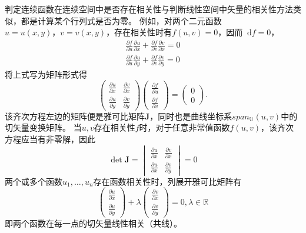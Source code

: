 \documentclass[UTF8]{ctexart}
\newcommand{\dif}{\mathop{}\!\mathrm{d}}
\begin{document}
判定连续函数在连续空间中是否存在相关性与判断线性空间中矢量的相关性方法类似，都是计算某个行列式是否为零。
例如，对两个二元函数$u=u(x,y)，v=v(x,y)$，存在相关性时有$f(u,v)=0$，因而$\dif f=0$，
\begin{eqnarray}
\frac{\partial f}{\partial u}\frac{\partial u}{\partial x}+\frac{\partial f}{\partial v}\frac{\partial v}{\partial x}=0\\
 \frac{\partial f}{\partial u}\frac{\partial u}{\partial y}+\frac{\partial f}{\partial v}\frac{\partial v}{\partial y}=0
\end{eqnarray}
将上式写为矩阵形式得
\begin{equation}
    \left(\begin{array}{cc}
        \frac{\partial u}{\partial x} & \frac{\partial v}{\partial x}\\
        \frac{\partial u}{\partial y} & \frac{\partial v}{\partial y}
    \end{array}\right)
    \left(\begin{array}{c}
        \frac{\partial f}{\partial u}\\
        \frac{\partial f}{\partial v}
    \end{array}\right)
    =
    \left(\begin{array}{c}
        0 \\ 0
    \end{array}\right).
\end{equation}
该齐次方程左边的矩阵便是雅可比矩阵\textbf{J}，同时也是曲线坐标系$span_{\mathbb{U}}(u,v)$中的切矢量变换矩阵。
当$u,v$存在相关性$f$时，对于任意非常值函数$f(u,v)$，该齐次方程应当有非零解，因此
\begin{equation}
    \det{\textbf{J}}=
    \begin{vmatrix}
        \frac{\partial u}{\partial x} & \frac{\partial v}{\partial x}\\
        \frac{\partial u}{\partial x} & \frac{\partial v}{\partial y}
    \end{vmatrix}
    =0
\end{equation}
两个或多个函数$u_{1},\dots,u_{n}$存在函数相关性时，列展开雅可比矩阵有
\begin{equation}
  \begin{pmatrix}
    \frac{\partial u}{\partial x} \\ \frac{\partial u}{\partial y}
  \end{pmatrix}+
  \lambda\begin{pmatrix}
    \frac{\partial v}{\partial x} \\ \frac{\partial v}{\partial y}
  \end{pmatrix}=0,\lambda \in \mathbb{R}
\end{equation}
即两个函数在每一点的切矢量线性相关（共线）。
\end{document}
